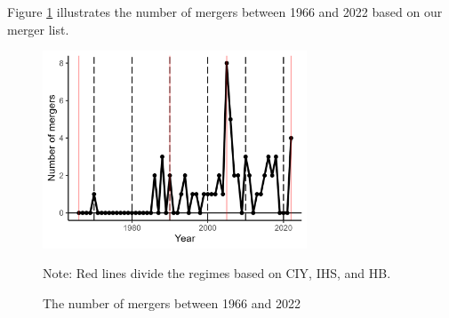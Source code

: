 \documentclass[10pt]{article}
\begin{document}
Figure \ref{fg:number_of_mergers} illustrates the number of mergers between 1966 and 2022 based on our merger list.

\begin{figure}[!ht]
\begin{center}
  \includegraphics[width = 0.7\textwidth]
  {figuretable/number_of_mergers.png}
  \caption{The number of mergers between 1966 and 2022}
  \label{fg:number_of_mergers}
  \end{center}
\footnotesize
   Note: Red lines divide the regimes based on CIY, IHS, and HB.
\end{figure}
\end{document}
